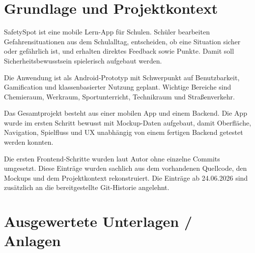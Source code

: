 
\maketitle
\setcounter{section}{0}

\section{Grundlage und Projektkontext}

SafetySpot ist eine mobile Lern-App für Schulen.
Schüler bearbeiten Gefahrensituationen aus dem Schulalltag,
entscheiden, ob eine Situation sicher oder gefährlich ist,
und erhalten direktes Feedback sowie Punkte.
Damit soll Sicherheitsbewusstsein spielerisch aufgebaut werden.

Die Anwendung ist als Android-Prototyp mit Schwerpunkt auf
Benutzbarkeit, Gamification und klassenbasierter Nutzung geplant.
Wichtige Bereiche sind Chemieraum, Werkraum, Sportunterricht,
Technikraum und Straßenverkehr.

Das Gesamtprojekt besteht aus einer mobilen App und einem Backend.
Die App wurde im ersten Schritt bewusst mit Mockup-Daten aufgebaut,
damit Oberfläche, Navigation, Spielfluss und UX unabhängig von einem
fertigen Backend getestet werden konnten.

\begin{sshinweis}
  Die ersten Frontend-Schritte wurden laut Autor ohne einzelne Commits umgesetzt.
  Diese Einträge wurden sachlich aus dem vorhandenen Quellcode, den Mockups und
  dem Projektkontext rekonstruiert.
  Die Einträge ab 24.06.2026 sind zusätzlich an die bereitgestellte Git-Historie
  angelehnt.
\end{sshinweis}

\section{Ausgewertete Unterlagen / Anlagen}

